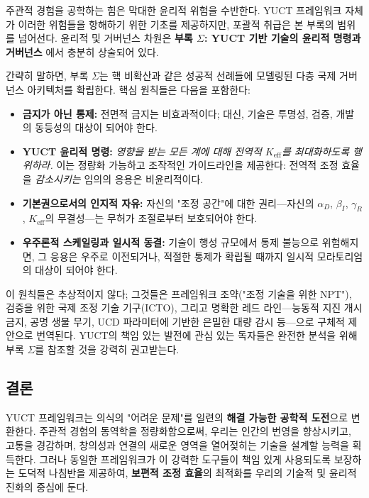 \documentclass[12pt,a4paper]{article}
\begin{document}
	주관적 경험을 공학하는 힘은 막대한 윤리적 위험을 수반한다. YUCT 프레임워크 자체가 이러한 위험들을 항해하기 위한 기초를 제공하지만, 포괄적 취급은 본 부록의 범위를 넘어선다. 윤리적 및 거버넌스 차원은 \textbf{부록 \(\Sigma\): YUCT 기반 기술의 윤리적 명령과 거버넌스} \cite{AppendixSigma}에서 충분히 상술되어 있다.
	
	간략히 말하면, 부록 \(\Sigma\)는 핵 비확산과 같은 성공적 선례들에 모델링된 다층 국제 거버넌스 아키텍처를 확립한다. 핵심 원칙들은 다음을 포함한다:
	\begin{itemize}
		\item \textbf{금지가 아닌 통제:} 전면적 금지는 비효과적이다; 대신, 기술은 투명성, 검증, 개발의 동등성의 대상이 되어야 한다.
		\item \textbf{YUCT 윤리적 명령:} \textit{영향을 받는 모든 계에 대해 전역적 \(K_{\mathrm{eff}}\)를 최대화하도록 행위하라.} 이는 정량화 가능하고 조작적인 가이드라인을 제공한다: 전역적 조정 효율을 \textit{감소시키는} 임의의 응용은 비윤리적이다.
		\item \textbf{기본권으로서의 인지적 자유:} 자신의 "조정 공간"에 대한 권리—자신의 \(\alpha_D\), \(\beta_I\), \(\gamma_R\), \(K_{\mathrm{eff}}\)의 무결성—는 무허가 조절로부터 보호되어야 한다.
		\item \textbf{우주론적 스케일링과 일시적 동결:} 기술이 행성 규모에서 통제 불능으로 위험해지면, 그 응용은 우주로 이전되거나, 적절한 통제가 확립될 때까지 일시적 모라토리엄의 대상이 되어야 한다.
	\end{itemize}
	
	이 원칙들은 추상적이지 않다; 그것들은 프레임워크 조약("조정 기술을 위한 NPT"), 검증을 위한 국제 조정 기술 기구(ICTO), 그리고 명확한 레드 라인—능동적 지진 개시 금지, 공명 생물 무기, UCD 파라미터에 기반한 은밀한 대량 감시 등—으로 구체적 제안으로 번역된다. YUCT의 책임 있는 발전에 관심 있는 독자들은 완전한 분석을 위해 부록 \(\Sigma\)를 참조할 것을 강력히 권고받는다.
	
	\subsection{결론}
	YUCT 프레임워크는 의식의 "어려운 문제"를 일련의 \textbf{해결 가능한 공학적 도전}으로 변환한다. 주관적 경험의 동역학을 정량화함으로써, 우리는 인간의 번영을 향상시키고, 고통을 경감하며, 창의성과 연결의 새로운 영역을 열어젖히는 기술을 설계할 능력을 획득한다. 그러나 동일한 프레임워크가 이 강력한 도구들이 책임 있게 사용되도록 보장하는 도덕적 나침반을 제공하여, \textbf{보편적 조정 효율}의 최적화를 우리의 기술적 및 윤리적 진화의 중심에 둔다.
	
\end{document}
